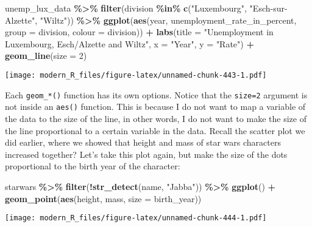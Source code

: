 \documentclass[
]{article}
\newenvironment{Shaded}{\begin{snugshade}}{\end{snugshade}}
\newcommand{\DataTypeTok}[1]{\textcolor[rgb]{0.13,0.29,0.53}{#1}}
\newcommand{\DecValTok}[1]{\textcolor[rgb]{0.00,0.00,0.81}{#1}}
\newcommand{\KeywordTok}[1]{\textcolor[rgb]{0.13,0.29,0.53}{\textbf{#1}}}
\newcommand{\NormalTok}[1]{#1}
\newcommand{\OperatorTok}[1]{\textcolor[rgb]{0.81,0.36,0.00}{\textbf{#1}}}
\newcommand{\StringTok}[1]{\textcolor[rgb]{0.31,0.60,0.02}{#1}}
\begin{document}
\begin{Shaded}
\begin{Highlighting}[]
\NormalTok{unemp\_lux\_data }\OperatorTok{\%\textgreater{}\%}
\StringTok{  }\KeywordTok{filter}\NormalTok{(division }\OperatorTok{\%in\%}\StringTok{ }\KeywordTok{c}\NormalTok{(}\StringTok{"Luxembourg"}\NormalTok{, }\StringTok{"Esch{-}sur{-}Alzette"}\NormalTok{, }\StringTok{"Wiltz"}\NormalTok{)) }\OperatorTok{\%\textgreater{}\%}
\StringTok{  }\KeywordTok{ggplot}\NormalTok{(}\KeywordTok{aes}\NormalTok{(year, unemployment\_rate\_in\_percent, }\DataTypeTok{group =}\NormalTok{ division, }\DataTypeTok{colour =}\NormalTok{ division)) }\OperatorTok{+}
\StringTok{  }\KeywordTok{labs}\NormalTok{(}\DataTypeTok{title =} \StringTok{"Unemployment in Luxembourg, Esch/Alzette and Wiltz"}\NormalTok{, }\DataTypeTok{x =} \StringTok{"Year"}\NormalTok{, }\DataTypeTok{y =} \StringTok{"Rate"}\NormalTok{) }\OperatorTok{+}
\StringTok{  }\KeywordTok{geom\_line}\NormalTok{(}\DataTypeTok{size =} \DecValTok{2}\NormalTok{)}
\end{Highlighting}
\end{Shaded}

\texttt{[image: modern\_R\_files/figure-latex/unnamed-chunk-443-1.pdf]}

Each \texttt{geom\_*()} function has its own options. Notice that the \texttt{size=2} argument is not inside
an \texttt{aes()} function. This is because I do not want to map a variable of the data to the size
of the line, in other words, I do not want to make the size of the line proportional to a certain
variable in the data. Recall the scatter plot we did earlier, where we showed that height and mass of
star wars characters increased together? Let's take this plot again, but make the size of the dots proportional
to the birth year of the character:

\begin{Shaded}
\begin{Highlighting}[]
\NormalTok{starwars }\OperatorTok{\%\textgreater{}\%}
\StringTok{  }\KeywordTok{filter}\NormalTok{(}\OperatorTok{!}\KeywordTok{str\_detect}\NormalTok{(name, }\StringTok{"Jabba"}\NormalTok{)) }\OperatorTok{\%\textgreater{}\%}
\StringTok{  }\KeywordTok{ggplot}\NormalTok{() }\OperatorTok{+}
\StringTok{    }\KeywordTok{geom\_point}\NormalTok{(}\KeywordTok{aes}\NormalTok{(height, mass, }\DataTypeTok{size =}\NormalTok{ birth\_year))}
\end{Highlighting}
\end{Shaded}

\texttt{[image: modern\_R\_files/figure-latex/unnamed-chunk-444-1.pdf]}
\end{document}
